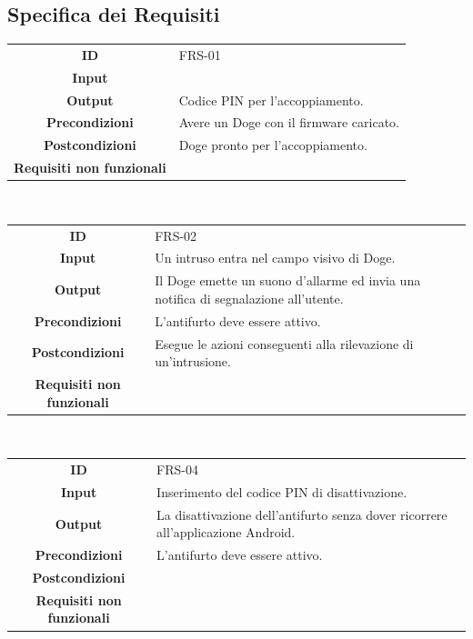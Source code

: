 \documentclass{article}
\begin{document}
    \subsection{Specifica dei Requisiti}
    
    \begin{adjustbox}{center}
    \begin{tabular}{|c|p{10cm}|}
    \hline
    \textbf{ID} & FRS-01\\
    \textbf{Input} &\\
    \textbf{Output} & Codice PIN per l'accoppiamento.\\
    \textbf{Precondizioni} & Avere un Doge con il firmware caricato.\\
    \textbf{Postcondizioni} & Doge pronto per l'accoppiamento.\\
    \textbf{Requisiti non funzionali} &\\
    \hline
    \end{tabular}
    \end{adjustbox}
    
    ~
    
    \begin{adjustbox}{center}
    \begin{tabular}{|c|p{10cm}|}
    \hline
    \textbf{ID} & FRS-02 \\
    \textbf{Input} & Un intruso entra nel campo visivo di Doge. \\
    \textbf{Output} & Il Doge emette un suono d'allarme ed invia una notifica di segnalazione all'utente. \\
    \textbf{Precondizioni} & L'antifurto deve essere attivo. \\
    \textbf{Postcondizioni} & Esegue le azioni conseguenti alla rilevazione di un'intrusione. \\
    \textbf{Requisiti non funzionali} &  \\
    \hline
    \end{tabular}
    \end{adjustbox}
    
    ~
    
    \begin{adjustbox}{center}
    \begin{tabular}{|c|p{10cm}|}
    \hline
    \textbf{ID} & FRS-04 \\
    \textbf{Input} & Inserimento del codice PIN di disattivazione.\\
    \textbf{Output} & La disattivazione dell'antifurto senza dover ricorrere all'applicazione Android.\\
    \textbf{Precondizioni} & L'antifurto deve essere attivo.\\
    \textbf{Postcondizioni} &\\
    \textbf{Requisiti non funzionali} &\\
    \hline
    \end{tabular}
    \end{adjustbox}
    
\end{document}
